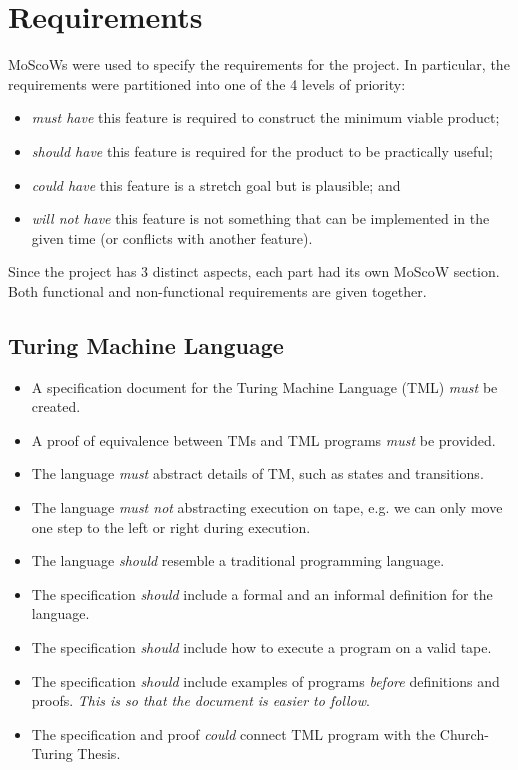\chapter{Requirements}

MoScoWs were used to specify the requirements for the project. In particular, the requirements were partitioned into one of the 4 levels of priority:
\begin{itemize}
    \item \emph{must have} this feature is required to construct the minimum viable product; 
    \item \emph{should have} this feature is required for the product to be practically useful;
    \item \emph{could have} this feature is a stretch goal but is plausible; and
    \item \emph{will not have} this feature is not something that can be implemented in the given time (or conflicts with another feature).
\end{itemize} 
Since the project has 3 distinct aspects, each part had its own MoScoW section. Both functional and non-functional requirements are given together.

\section{Turing Machine Language}
\begin{itemize}
    \item A specification document for the Turing Machine Language (TML) \emph{must} be created.
    \item A proof of equivalence between TMs and TML programs \emph{must} be provided. 
    \item The language \emph{must} abstract details of TM, such as states and transitions.
    \item The language \emph{must not} abstracting execution on tape, e.g. we can only move one step to the left or right during execution.
    \item The language \emph{should} resemble a traditional programming language.
    \item The specification \emph{should} include a formal and an informal definition for the language.
    \item The specification \emph{should} include how to execute a program on a valid tape.
    \item The specification \emph{should} include examples of programs \textit{before} definitions and proofs. \textit{This is so that the document is easier to follow}.
    \item The specification and proof \emph{could} connect TML program with the Church-Turing Thesis. 
\end{itemize}

